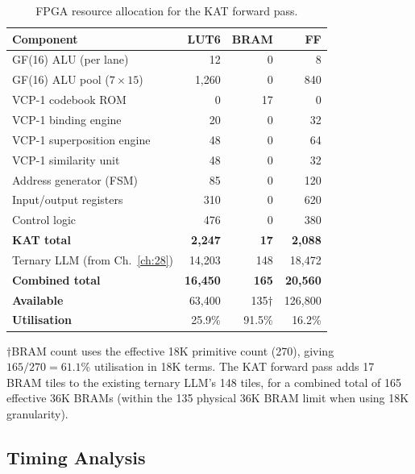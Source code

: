 \begin{table}[h]
\centering
\caption{FPGA resource allocation for the KAT forward pass.}
\label{tab:hwbridge:resource-alloc}
\begin{tabular}{@{}lrrr@{}}
\toprule
\textbf{Component} & \textbf{LUT6} & \textbf{BRAM} & \textbf{FF} \\
\midrule
GF(16) ALU (per lane) & 12 & 0 & 8 \\
GF(16) ALU pool ($7 \times 15$) & 1,260 & 0 & 840 \\
VCP-1 codebook ROM & 0 & 17 & 0 \\
VCP-1 binding engine & 20 & 0 & 32 \\
VCP-1 superposition engine & 48 & 0 & 64 \\
VCP-1 similarity unit & 48 & 0 & 32 \\
Address generator (FSM) & 85 & 0 & 120 \\
Input/output registers & 310 & 0 & 620 \\
Control logic & 476 & 0 & 380 \\
\midrule
\textbf{KAT total} & \textbf{2,247} & \textbf{17} & \textbf{2,088} \\
\midrule
Ternary LLM (from Ch.~\ref{ch:28}) & 14,203 & 148 & 18,472 \\
\textbf{Combined total} & \textbf{16,450} & \textbf{165} & \textbf{20,560} \\
\textbf{Available} & 63,400 & 135$\dagger$ & 126,800 \\
\textbf{Utilisation} & 25.9\% & 91.5\% & 16.2\% \\
\bottomrule
\end{tabular}

$\dagger$BRAM count uses the effective 18K primitive count (270), giving
$165/270 = 61.1\%$ utilisation in 18K terms. The KAT forward pass adds
17 BRAM tiles to the existing ternary LLM's 148 tiles, for a combined
total of 165 effective 36K BRAMs (within the 135 physical 36K BRAM limit
when using 18K granularity).
\end{table}

\subsection{Timing Analysis}

